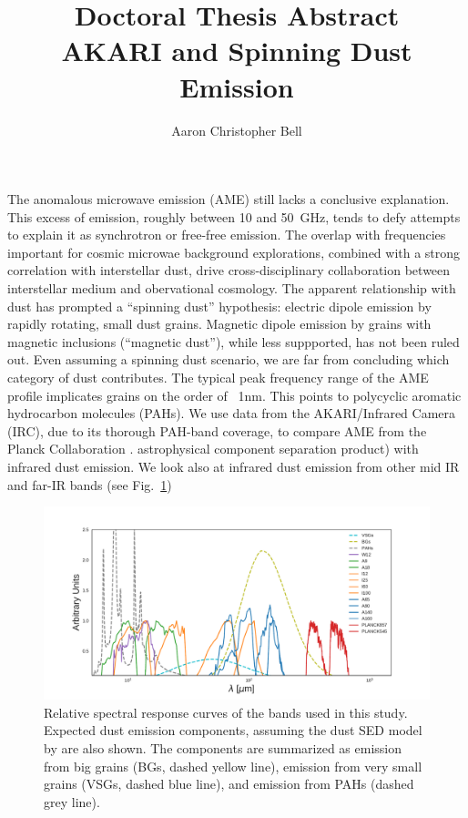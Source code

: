 \documentclass[11pt,a4paper]{article}
\title{Doctoral Thesis Abstract\\
AKARI and Spinning Dust Emission\\
}
\author{Aaron Christopher Bell}
\numberwithin{equation}{section}
\begin{document}
\maketitle
\singlespacing

The anomalous microwave emission (AME) still lacks a conclusive explanation.  This excess of emission, roughly between 10 and 50~GHz, tends to defy attempts to explain it as synchrotron or free-free emission. The overlap with frequencies important for cosmic microwae background explorations, combined with a strong correlation with interstellar dust, drive cross-disciplinary collaboration between interstellar medium and obervational cosmology. The apparent relationship with dust has prompted a ``spinning dust'' hypothesis:  electric dipole emission by rapidly rotating, small dust grains. Magnetic dipole emission by grains with magnetic inclusions (``magnetic dust''), while less suppported, has not been ruled out. Even assuming a spinning dust scenario, we are far from concluding which category of dust contributes. The typical peak frequency range of the AME profile implicates grains on the order of ~1nm. This points to polycyclic aromatic hydrocarbon molecules (PAHs). We use data from the AKARI/Infrared Camera (IRC)\cite{irc07,ishihara10}, due to its thorough PAH-band coverage, to compare AME from the Planck Collaboration \cite{planck15X}. astrophysical component separation product) with infrared dust emission. We look also at infrared dust emission from other mid IR and far-IR bands (see Fig.~\ref{fig:Filter_coverage_example_full})
  \begin{figure}
    \centering
    \includegraphics[width=\textwidth]{../Plots/ch_datasources/Filter_coverage_example_full.pdf}
    \caption{Relative spectral response curves of the bands used in this study. Expected dust emission components, assuming the dust SED model by \citep{dustem11} are also shown. The components are summarized as emission from big grains (BGs, dashed yellow line), emission from very small grains (VSGs, dashed blue line), and emission from PAHs (dashed grey line).}
    \label{fig:Filter_coverage_example_full}
  \end{figure}
\end{document}
